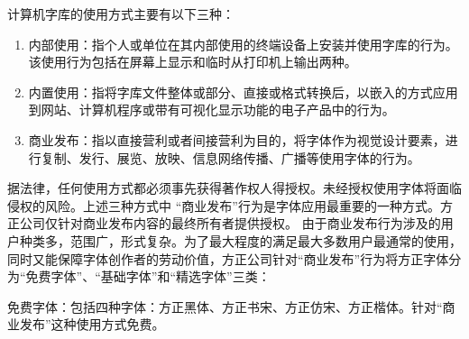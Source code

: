 \documentclass{../../PublicResources/DocClass}
\begin{document}
    计算机字库的使用方式主要有以下三种：
    \begin{enumerate}
        \item 内部使用：指个人或单位在其内部使用的终端设备上安装并使用字库的行为。该使用行为包括在屏幕上显示和临时从打印机上输出两种。
        \item 内置使用：指将字库文件整体或部分、直接或格式转换后，以嵌入的方式应用到网站、计算机程序或带有可视化显示功能的电子产品中的行为。
        \item 商业发布：指以直接营利或者间接营利为目的，将字体作为视觉设计要素，进行复制、发行、展览、放映、信息网络传播、广播等使用字体的行为。
    \end{enumerate}

    据法律，任何使用方式都必须事先获得著作权人得授权。未经授权使用字体将面临侵权的风险。上述三种方式中 “商业发布”行为是字体应用最重要的一种方式。方正公司仅针对商业发布内容的最终所有者提供授权。 由于商业发布行为涉及的用户种类多，范围广，形式复杂。为了最大程度的满足最大多数用户最通常的使用，同时又能保障字体创作者的劳动价值，方正公司针对“商业发布”行为将方正字体分为“免费字体”、“基础字体”和“精选字体”三类：

    免费字体：包括四种字体：方正黑体、方正书宋、方正仿宋、方正楷体。针对“商业发布”这种使用方式免费。
\end{document}
